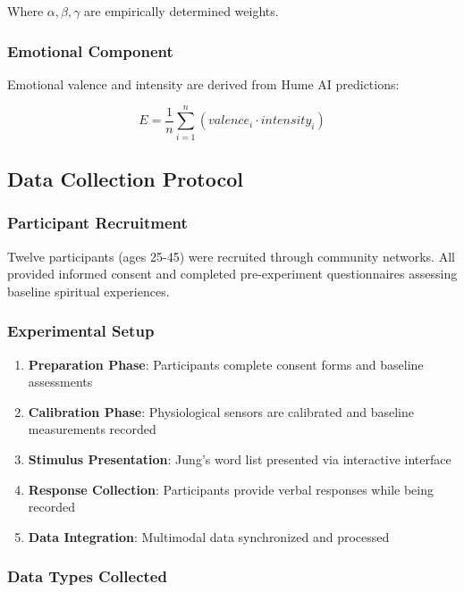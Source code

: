 \documentclass[12pt,a4paper]{article}
\begin{document}
Where $\alpha, \beta, \gamma$ are empirically determined weights.

\subsubsection{Emotional Component}

Emotional valence and intensity are derived from Hume AI predictions:

\begin{equation}
E = \frac{1}{n} \sum_{i=1}^{n} (valence_i \cdot intensity_i)
\end{equation}

\subsection{Data Collection Protocol}

\subsubsection{Participant Recruitment}
Twelve participants (ages 25-45) were recruited through community networks. All provided informed consent and completed pre-experiment questionnaires assessing baseline spiritual experiences.

\subsubsection{Experimental Setup}

\begin{enumerate}
    \item \textbf{Preparation Phase}: Participants complete consent forms and baseline assessments
    \item \textbf{Calibration Phase}: Physiological sensors are calibrated and baseline measurements recorded
    \item \textbf{Stimulus Presentation}: Jung's word list presented via interactive interface
    \item \textbf{Response Collection}: Participants provide verbal responses while being recorded
    \item \textbf{Data Integration}: Multimodal data synchronized and processed
\end{enumerate}

\subsubsection{Data Types Collected}
\end{document}
